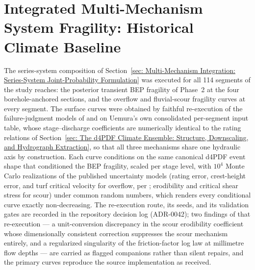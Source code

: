 %

\section{Integrated Multi-Mechanism System Fragility: Historical Climate Baseline}
\label{sec: Integrated Multi-Mechanism System Fragility: Historical Climate Baseline}

The series-system composition of Section~\ref{sec: Multi-Mechanism
Integration: Series-System Joint-Probability Formulation} was executed for
all 114 segments of the study reaches: the posterior transient BEP
fragility of Phase~2 at the four borehole-anchored sections, and the
overflow and fluvial-scour fragility curves at every segment. The surface
curves were obtained by faithful re-execution of the failure-judgment
models of \textcite{uemura_phd_2025} and \textcite{uemura_wp2_2024} on
Uemura's own consolidated per-segment input table, whose stage--discharge
coefficients are numerically identical to the rating relations of
Section~\ref{sec: The d4PDF Climate Ensemble: Structure, Downscaling, and
Hydrograph Extraction}, so that all three mechanisms share one hydraulic
axis by construction. Each curve conditions on the same canonical d4PDF
event shape that conditioned the BEP fragility, scaled per stage level,
with $10^4$ Monte Carlo realizations of the published uncertainty models
(rating error, crest-height error, and turf critical velocity for
overflow, per \textcite{dean_2010}; erodibility and critical shear stress
for scour) under common random numbers, which renders every conditional
curve exactly non-decreasing. The re-execution route, its seeds, and its
validation gates are recorded in the repository decision log (ADR-0042);
two findings of that re-execution --- a unit-conversion discrepancy in the
scour erodibility coefficient whose dimensionally consistent correction
suppresses the scour mechanism entirely, and a regularized singularity of
the friction-factor log law at millimetre flow depths --- are carried as
flagged companions rather than silent repairs, and the primary curves
reproduce the source implementation as received.

